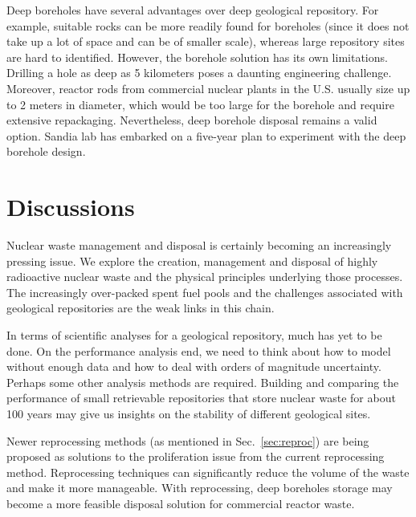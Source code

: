 \documentclass[nofootinbib,preprint,aps]{revtex4-1}
\begin{document}
        Deep boreholes have several advantages over deep geological repository. For example, suitable
        rocks can be more readily found for boreholes (since it does not take up a lot of space and can be
        of smaller scale),
        whereas large repository sites are hard to identified. \cite{b09,c15}
        However, the borehole solution has its own limitations.
        Drilling a hole as deep as 5 kilometers poses a daunting engineering challenge.
        Moreover, reactor rods from commercial nuclear plants in the U.S. usually size up to 2 meters in diameter,
        which would be too large for the borehole and require extensive repackaging.
        Nevertheless, deep borehole disposal remains a valid option.
        Sandia lab has embarked on a five-year plan to experiment with the deep borehole design.\cite{c15}

\section{Discussions}
Nuclear waste management and disposal is certainly becoming an increasingly pressing issue.
We explore the creation, management and disposal of highly radioactive nuclear waste and the physical
principles underlying those processes. The increasingly over-packed spent fuel pools and the challenges
associated with geological repositories are the weak links in this chain.

In terms of scientific analyses for a geological repository, much has yet to be done.
On the performance analysis end, we need
to think about how to model without enough data and how to deal with orders of magnitude uncertainty.
Perhaps some other analysis methods are required. Building and comparing the performance of 
small retrievable repositories that store
nuclear waste for about 100 years may give us insights on the stability of different geological sites.

Newer reprocessing methods (as mentioned in Sec.~\ref{sec:reproc}) are being proposed
as  solutions to the proliferation issue from the current reprocessing method.
 Reprocessing techniques can significantly reduce the volume of the waste and make it more
manageable. With reprocessing, deep boreholes storage may become a more feasible disposal solution 
for commercial reactor waste. 

\newpage


\end{document}
